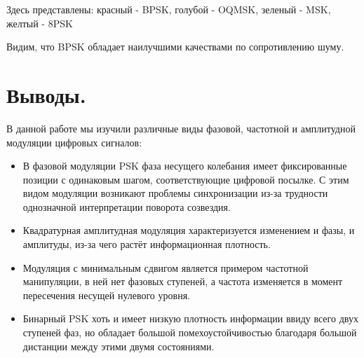 \documentclass[a4paper,14pt]{extarticle}
\begin{document}
Здесь представлены: красный - BPSK, голубой - OQMSK, зеленый - MSK, желтый - 8PSK

Видим, что BPSK обладает наилучшими качествами по сопротивлению шуму.

\vspace{8cm}

\section{Выводы.}

В данной работе мы изучили различные виды фазовой, частотной и амплитудной модуляции цифровых сигналов:
\begin{itemize}

\item В фазовой модуляции PSK фаза несущего колебания имеет фиксированные позиции с одинаковым шагом, соответствующие цифровой посылке. С этим видом модуляции возникают проблемы синхронизации из-за трудности однозначной интерпретации поворота созвездия.

\item Квадратурная амплитудная модуляция характеризуется изменением и фазы, и амплитуды, из-за чего растёт информационная плотность.

\item Модуляция с минимальным сдвигом является примером частотной манипуляции, в ней нет фазовых ступеней, а частота изменяется в момент пересечения несущей нулевого уровня.

\item Бинарный PSK хоть и имеет низкую плотность информации ввиду всего двух ступеней фаз, но обладает большой помехоустойчивостью благодаря большой дистанции между этими двумя состояниями.
\end{itemize}
\end{document}
